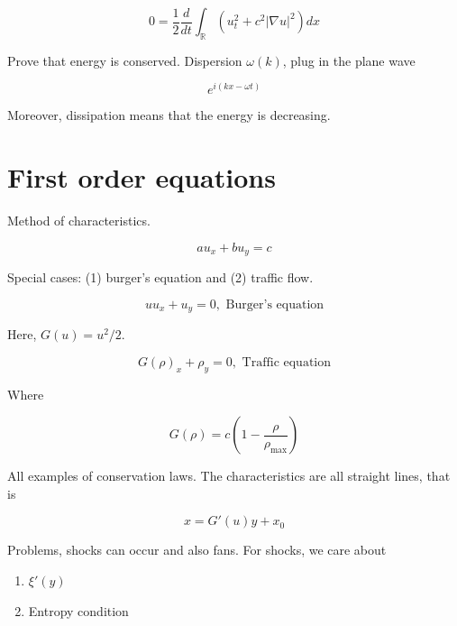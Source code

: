 \documentclass{article}
\newtheorem{one minute paper}[theorem]{One Minute Paper}
\begin{document}
\begin{equation}
    0 = \frac{1}{2}\frac{d}{dt}\int_{\mathbb{R}}\left( u_t^2 + c^2 |\nabla u|^2 \right)dx
\end{equation}

Prove that energy is conserved. Dispersion $\omega(k)$, plug in the plane wave 

\begin{equation}
    e^{i(kx - \omega t)}
\end{equation}

Moreover, dissipation means that the energy is decreasing. 

\section*{First order equations}

Method of characteristics. 

\begin{equation}
    au_x + bu_y = c
\end{equation}

Special cases: (1) burger's equation and (2) traffic flow.

\begin{equation}
    uu_x + u_y = 0, \text{ Burger's equation}
\end{equation}

Here, $G(u) = u^2/2$. 

\begin{equation}
    G(\rho)_x + \rho_y = 0, \text{ Traffic equation}
\end{equation}

Where 

\begin{equation}
    G(\rho) = c\left( 1- \frac{\rho}{\rho_{\max}} \right)
\end{equation}

All examples of conservation laws. The characteristics are all straight lines, that is 

\begin{equation}
    x = G'(u)y + x_0
\end{equation}

Problems, shocks can occur and also fans. For shocks, we care about 

\begin{enumerate}
    \item $\xi'(y)$
    \item Entropy condition
\end{enumerate}
\end{document}
